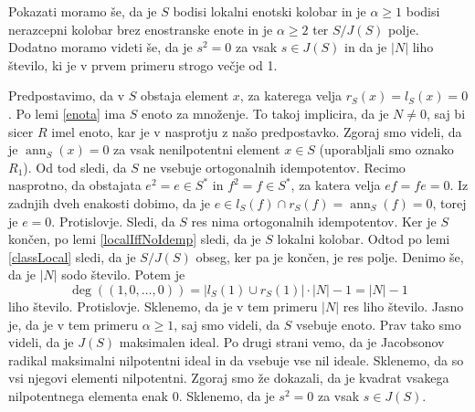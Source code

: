 \documentclass[a4paper, 12pt]{amsart}
\theoremstyle{definition} %
\theoremstyle{plain} %
\DeclareMathOperator{\ann}{ann}
\begin{document}
Pokazati moramo še, da je $S$ bodisi lokalni enotski kolobar in je $\alpha \ge 1$ bodisi nerazcepni kolobar brez enostranske enote in je $\alpha \ge 2$ ter $S/J(S)$ polje. Dodatno moramo videti še, da je $s^2 = 0$ za vsak $s\in J(S)$ in da je $|N|$ liho število, ki je v prvem primeru strogo večje od 1. 

Predpostavimo, da v $S$ obstaja element $x$, za katerega velja $r_S(x) = l_S(x) = 0$. Po lemi \ref{enota} ima $S$ enoto za množenje. To takoj implicira, da je $N\neq 0$, saj bi sicer $R$ imel enoto, kar je v nasprotju z našo predpostavko. Zgoraj smo videli, da je $\ann_S(x) = 0$ za vsak nenilpotentni element $x\in S$ (uporabljali smo oznako $R_1$). Od tod sledi, da $S$ ne vsebuje ortogonalnih idempotentov. Recimo nasprotno, da obstajata $e^2 = e\in S^*$ in $f^2 = f\in S^*$, za katera velja $ef = fe=0$. Iz zadnjih dveh enakosti dobimo, da je $e\in l_S(f) \cap r_S(f) =\ann_S(f) = 0$, torej je $e=0$. Protislovje. Sledi, da $S$ res nima ortogonalnih idempotentov. Ker je $S$ končen, po lemi \ref{localIffNoIdemp} sledi, da je $S$ lokalni kolobar. Odtod po lemi \ref{classLocal} sledi, da je $S/J(S)$ obseg, ker pa je končen, je res polje. Denimo še, da je $|N|$ sodo število. Potem je 
$$
\deg((1,0,\dots,0)) = |l_S(1)\cup r_S(1)|\cdot |N| - 1 = |N| - 1
$$
liho število. Protislovje. Sklenemo, da je v tem primeru $|N|$ res liho število. Jasno je, da je v tem primeru $\alpha \ge 1$, saj smo videli, da $S$ vsebuje enoto. Prav tako smo videli, da je $J(S)$ maksimalen ideal. Po drugi strani vemo, da je Jacobsonov radikal maksimalni nilpotentni ideal in da vsebuje vse nil ideale. Sklenemo, da so vsi njegovi elementi nilpotentni. Zgoraj smo že dokazali, da je kvadrat vsakega nilpotentnega elementa enak 0. Sklenemo, da je $s^2 = 0$ za vsak $s\in J(S)$.
\end{document}
